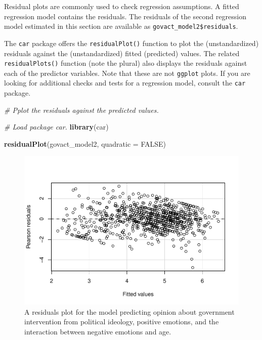 \documentclass[doc,floatsintext]{apa6}
\newenvironment{Shaded}{\begin{snugshade}}{\end{snugshade}}
\newcommand{\KeywordTok}[1]{\textcolor[rgb]{0.13,0.29,0.53}{\textbf{#1}}}
\newcommand{\DataTypeTok}[1]{\textcolor[rgb]{0.13,0.29,0.53}{#1}}
\newcommand{\CommentTok}[1]{\textcolor[rgb]{0.56,0.35,0.01}{\textit{#1}}}
\newcommand{\OtherTok}[1]{\textcolor[rgb]{0.56,0.35,0.01}{#1}}
\newcommand{\NormalTok}[1]{#1}
\begin{document}
Residual plots are commonly used to check regression assumptions. A
fitted regression model contains the residuals. The residuals of the
second regression model estimated in this section are available as
\texttt{govact\_model2\$residuals}.

The \texttt{car} package offers the \texttt{residualPlot()} function to
plot the (unstandardized) residuals against the (unstandardized) fitted
(predicted) values. The related \texttt{residualPlots()} function (note
the plural) also displays the residuals against each of the predictor
variables. Note that these are not \texttt{ggplot} plots. If you are
looking for additional checks and tests for a regression model, consult
the \texttt{car} package.

\begin{Shaded}
\begin{Highlighting}[]
\CommentTok{# Pplot the residuals against the predicted values.}

\CommentTok{# Load package car.}
\KeywordTok{library}\NormalTok{(car)}

\KeywordTok{residualPlot}\NormalTok{(govact_model2,}
             \DataTypeTok{quadratic =} \OtherTok{FALSE}\NormalTok{)}
\end{Highlighting}
\end{Shaded}

\begin{figure}[H]
\centering
\includegraphics[width=12cm]{HelpMyCollaboratorUsesR_files/figure-latex/plotresiduals-1.pdf}
\caption{\label{fig:plotresiduals}A residuals plot for the model predicting
opinion about government intervention from political ideology, positive
emotions, and the interaction between negative emotions and age.}
\end{figure}
\end{document}
